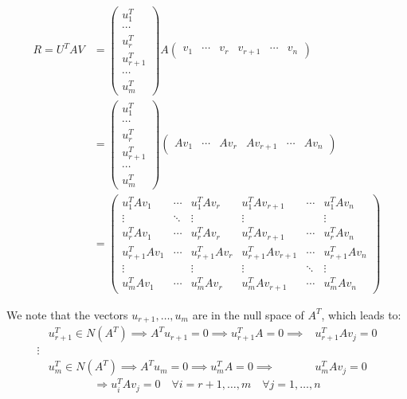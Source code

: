 \[
\begin{aligned}
    R = U^T A V &= \begin{pmatrix}
        u_1^T \\
        \cdots \\
        u_r^T \\
        u_{r+1}^T \\
        \cdots \\
        u_m^T
        \end{pmatrix} A \begin{pmatrix}
        v_1 & \cdots & v_r & v_{r+1} & \cdots & v_n
        \end{pmatrix} \\
    &= \begin{pmatrix}
            u_1^T \\
            \cdots \\
            u_r^T \\
            u_{r+1}^T \\
            \cdots \\
            u_m^T
        \end{pmatrix}
        \begin{pmatrix}
            Av_1 & \cdots & Av_r & Av_{r+1} & \cdots & Av_n
        \end{pmatrix} \\
    &= \begin{pmatrix}
        u_1^T A v_1 & \cdots & u_1^T A v_r & u_1^T A v_{r+1} & \cdots & u_1^T A v_n \\
        \vdots & \ddots & \vdots & \vdots & & \vdots \\
        u_r^T A v_1 & \cdots & u_r^T A v_r & u_r^T A v_{r+1} & \cdots & u_r^T A v_n \\
        u_{r+1}^T A v_1 & \cdots & u_{r+1}^T A v_r & u_{r+1}^T A v_{r+1} & \cdots & u_{r+1}^T A v_n \\
        \vdots & & \vdots & \vdots & \ddots & \vdots \\
        u_m^T A v_1 & \cdots & u_m^T A v_r & u_m^T A v_{r+1} & \cdots & u_m^T A v_n
        \end{pmatrix}
\end{aligned}
\]

We note that the vectors \( u_{r+1}, \ldots, u_m \) are in the null space of \( A^T \), which leads to:
\[
\begin{aligned}
&u_{r+1}^T \in N(A^T) \implies A^T u_{r+1} = 0 \implies u_{r+1}^T A = 0 \implies &u_{r+1}^T A v_j = 0 \\
\vdots \\
&u_m^T \in N(A^T) \implies A^T u_m = 0 \implies u_m^T A = 0 \implies &u_m^T A v_j = 0 
\end{aligned}
\]
$$ \Rightarrow u_i^TAv_j = 0 \quad \forall i = r+1, \dots, m \quad \forall j = 1, \dots, n $$

